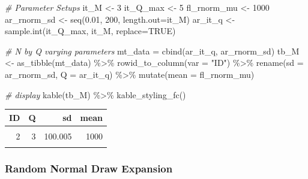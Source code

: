 \documentclass[
]{book}
\newenvironment{Shaded}{\begin{snugshade}}{\end{snugshade}}
\newcommand{\AttributeTok}[1]{\textcolor[rgb]{0.77,0.63,0.00}{#1}}
\newcommand{\CommentTok}[1]{\textcolor[rgb]{0.56,0.35,0.01}{\textit{#1}}}
\newcommand{\ConstantTok}[1]{\textcolor[rgb]{0.00,0.00,0.00}{#1}}
\newcommand{\DecValTok}[1]{\textcolor[rgb]{0.00,0.00,0.81}{#1}}
\newcommand{\FloatTok}[1]{\textcolor[rgb]{0.00,0.00,0.81}{#1}}
\newcommand{\FunctionTok}[1]{\textcolor[rgb]{0.00,0.00,0.00}{#1}}
\newcommand{\NormalTok}[1]{#1}
\newcommand{\OtherTok}[1]{\textcolor[rgb]{0.56,0.35,0.01}{#1}}
\newcommand{\SpecialCharTok}[1]{\textcolor[rgb]{0.00,0.00,0.00}{#1}}
\newcommand{\StringTok}[1]{\textcolor[rgb]{0.31,0.60,0.02}{#1}}
\begin{document}
\begin{Shaded}
\begin{Highlighting}[]
\CommentTok{\# Parameter Setups}
\NormalTok{it\_M }\OtherTok{\textless{}{-}} \DecValTok{3}
\NormalTok{it\_Q\_max }\OtherTok{\textless{}{-}} \DecValTok{5}
\NormalTok{fl\_rnorm\_mu }\OtherTok{\textless{}{-}} \DecValTok{1000}
\NormalTok{ar\_rnorm\_sd }\OtherTok{\textless{}{-}} \FunctionTok{seq}\NormalTok{(}\FloatTok{0.01}\NormalTok{, }\DecValTok{200}\NormalTok{, }\AttributeTok{length.out=}\NormalTok{it\_M)}
\NormalTok{ar\_it\_q }\OtherTok{\textless{}{-}} \FunctionTok{sample.int}\NormalTok{(it\_Q\_max, it\_M, }\AttributeTok{replace=}\ConstantTok{TRUE}\NormalTok{)}

\CommentTok{\# N by Q varying parameters}
\NormalTok{mt\_data }\OtherTok{=} \FunctionTok{cbind}\NormalTok{(ar\_it\_q, ar\_rnorm\_sd)}
\NormalTok{tb\_M }\OtherTok{\textless{}{-}} \FunctionTok{as\_tibble}\NormalTok{(mt\_data) }\SpecialCharTok{\%\textgreater{}\%} \FunctionTok{rowid\_to\_column}\NormalTok{(}\AttributeTok{var =} \StringTok{"ID"}\NormalTok{) }\SpecialCharTok{\%\textgreater{}\%}
                \FunctionTok{rename}\NormalTok{(}\AttributeTok{sd =}\NormalTok{ ar\_rnorm\_sd, }\AttributeTok{Q =}\NormalTok{ ar\_it\_q) }\SpecialCharTok{\%\textgreater{}\%}
                \FunctionTok{mutate}\NormalTok{(}\AttributeTok{mean =}\NormalTok{ fl\_rnorm\_mu)}

\CommentTok{\# display}
\FunctionTok{kable}\NormalTok{(tb\_M) }\SpecialCharTok{\%\textgreater{}\%}
  \FunctionTok{kable\_styling\_fc}\NormalTok{()}
\end{Highlighting}
\end{Shaded}

\begin{table}[!h]
\centering
\begin{tabular}{r|r|r|r}
\hline
ID & Q & sd & mean\\
\hline
\cellcolor{gray!6}{1} & \cellcolor{gray!6}{1} & \cellcolor{gray!6}{0.010} & \cellcolor{gray!6}{1000}\\
\hline
2 & 3 & 100.005 & 1000\\
\hline
\cellcolor{gray!6}{3} & \cellcolor{gray!6}{4} & \cellcolor{gray!6}{200.000} & \cellcolor{gray!6}{1000}\\
\hline
\end{tabular}
\end{table}

\hypertarget{random-normal-draw-expansion}{%
\subsubsection{Random Normal Draw Expansion}\label{random-normal-draw-expansion}}
\end{document}
